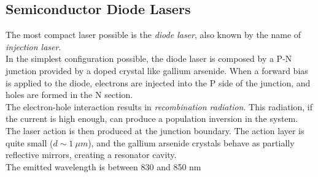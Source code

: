 \documentclass[../electromagnetism.tex]{subfiles}
\begin{document}
\subsection{Semiconductor Diode Lasers}
The most compact laser possible is the \textit{diode laser}, also known by the name of \textit{injection laser}.\\
In the simplest configuration possible, the diode laser is composed by a P-N junction provided by a doped crystal like gallium arsenide. When a forward bias is applied to the diode, electrons are injected into the P side of the junction, and holes are formed in the N section.\\
The electron-hole interaction results in \textit{recombination radiation}. This radiation, if the current is high enough, can produce a population inversion in the system. The laser action is then produced at the junction boundary. The action layer is quite small ($d\sim1\ \mu m$), and the gallium arsenide crystals behave as partially reflective mirrors, creating a resonator cavity.\\
The emitted wavelength is between 830 and 850 nm
\end{document}
